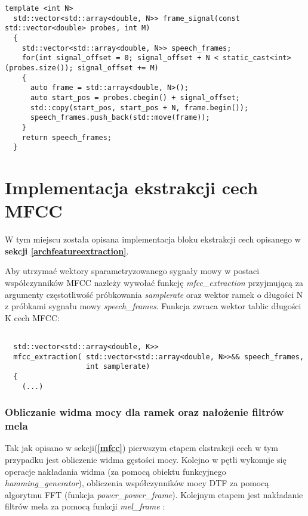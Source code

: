 \begin{lstlisting}[style=lst:cpp, caption=Implementacja funkcji \textit{frame\_signal}\label{lst:frame}]
  template <int N>
  std::vector<std::array<double, N>> frame_signal(const std::vector<double> probes, int M)
  {
    std::vector<std::array<double, N>> speech_frames;
    for(int signal_offset = 0; signal_offset + N < static_cast<int>(probes.size()); signal_offset += M)
    {
      auto frame = std::array<double, N>();
      auto start_pos = probes.cbegin() + signal_offset;
      std::copy(start_pos, start_pos + N, frame.begin());
      speech_frames.push_back(std::move(frame));
    }
    return speech_frames;
  }
\end{lstlisting}

\section{Implementacja ekstrakcji cech MFCC}

W tym miejscu została opisana implementacja bloku ekstrakcji cech opisanego w \textbf{sekcji \ref{archfeatureextraction}}.

Aby utrzymać wektory sparametryzowanego sygnały mowy w postaci współczynników MFCC nazleży wywołać funkcję \textit{mfcc\_extraction} przyjmującą za argumenty częstotliwość próbkowania \textit{samplerate} oraz wektor ramek o długości N z próbkami sygnału mowy \textit{speech\_frames}. Funkcja zwraca wektor tablic długości K cech MFCC:

\begin{lstlisting}[style=lst:cpp, caption=Implementacja funkcji mfcc\_extraction\label{lst:mfcc}]

  std::vector<std::array<double, K>>
  mfcc_extraction( std::vector<std::array<double, N>>&& speech_frames,
                   int samplerate)
  {
    (...)
\end{lstlisting}

    \subsubsection{Obliczanie widma mocy dla ramek oraz nałożenie filtrów mela}

Tak jak opisano w sekcji(\textbf{\ref{mfcc}}) pierwszym etapem ekstrakcji cech w tym przypadku jest obliczenie widma gęstości mocy. Kolejno w pętli wykonuje się operacje nakładania widma (za pomocą obiektu funkcyjnego \textit{hamming\_generator}), obliczenia współczynników mocy DTF za pomocą algorytmu FFT (funkcja \textit{power\_power\_frame}). Kolejnym etapem jest nakładanie filtrów mela za pomocą funkcji \textit{mel\_frame} : 

